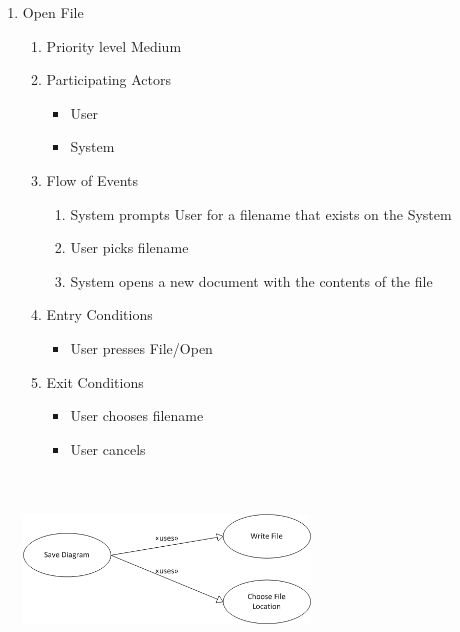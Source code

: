 \documentclass[a4paper, 12pt]{article}
\begin{document}
\begin{enumerate}
\item{Open File}
  \begin{enumerate}
  \item{Priority} level Medium
  \item{Participating Actors}
    \begin {itemize}
    \item User
    \item System
    \end{itemize}
  \item{Flow of Events}
    \begin{enumerate}
    \item {System prompts User for a filename that exists on the System}
    \item {User picks filename}
    \item {System opens a new document with the contents of the file}
    \end{enumerate}
  \item {Entry Conditions}
    \begin{itemize}
    \item User presses File/Open
    \end{itemize}
  \item Exit Conditions
    \begin{itemize}
    \item User chooses filename
    \item User cancels
    \end{itemize}
  \end {enumerate}

  \begin {center}
    \includegraphics[height=2in,width=3in]{img/SaveDiagram.png}
  \end {center}


\end{enumerate}
\end{document}
